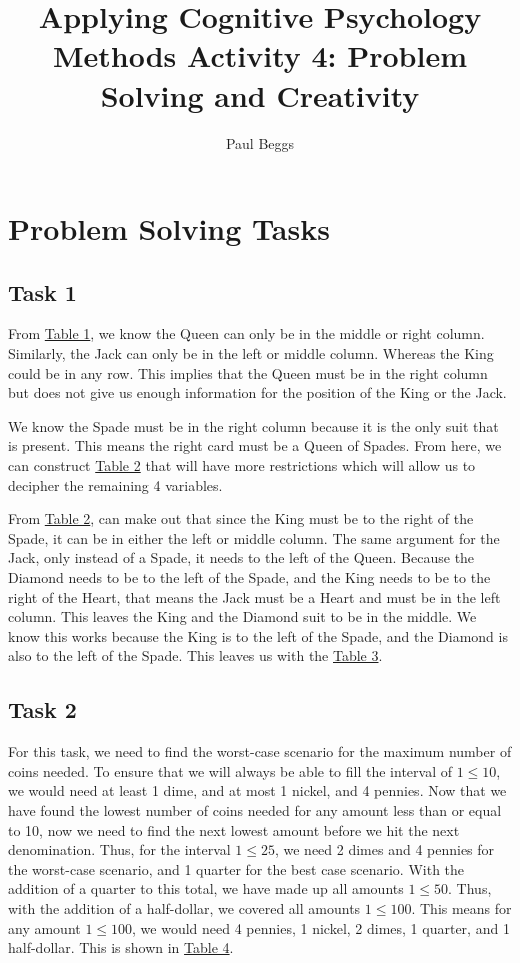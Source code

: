 \documentclass[stu,12pt,floatsintext]{apa7}
\title{Applying Cognitive Psychology Methods Activity 4: Problem Solving and Creativity} %
\author{Paul Beggs}
\begin{document}
\maketitle 

\section{Problem Solving Tasks}

\subsection{Task 1}


From \hyperref[tab:table1]{Table 1}, we know the Queen can only be in the middle or right column. Similarly, the Jack can only be in the left or middle column. Whereas the King could be in any row. This implies that the Queen must be in the right column but does not give us enough information for the position of the King or the Jack.

We know the Spade must be in the right column because it is the only suit that is present. This means the right card must be a Queen of Spades. From here, we can construct \hyperref[tab:table2]{Table 2} that will have more restrictions which will allow us to decipher the remaining 4 variables. 

From \hyperref[tab:table2]{Table 2}, can make out that since the King must be to the right of the Spade, it can be in either the left or middle column. The same argument for the Jack, only instead of a Spade, it needs to the left of the Queen. Because the Diamond needs to be to the left of the Spade, and the King needs to be to the right of the Heart, that means the Jack must be a Heart and must be in the left column. This leaves the King and the Diamond suit to be in the middle. We know this works because the King is to the left of the Spade, and the Diamond is also to the left of the Spade. This leaves us with the \hyperref[tab:table3]{Table 3}.

\subsection{Task 2}

For this task, we need to find the worst-case scenario for the maximum number of coins needed. To ensure that we will always be able to fill the interval of \(1 \leq 10\), we would need at least 1 dime, and at most 1 nickel, and 4 pennies. Now that we have found the lowest number of coins needed for any amount less than or equal to 10, now we need to find the next lowest amount before we hit the next denomination. Thus, for the interval \(1 \leq 25\), we need 2 dimes and 4 pennies for the worst-case scenario, and 1 quarter for the best case scenario. With the addition of a quarter to this total, we have made up all amounts \(1 \leq 50\). Thus, with the addition of a half-dollar, we covered all amounts \(1 \leq 100\). This means for any amount \(1 \leq 100\), we would need 4 pennies, 1 nickel, 2 dimes, 1 quarter, and 1 half-dollar. This is shown in \hyperref[tab:table4]{Table 4}.
\end{document}

